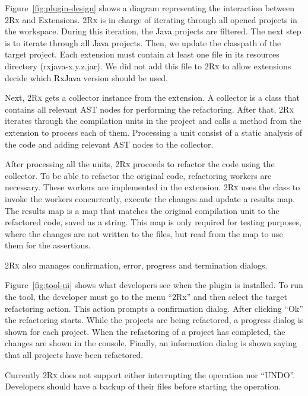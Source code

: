 \documentclass[type=bsc,accentcolor=tud9c]{tudthesis}
\newcommand{\framework}[1]{\textcolor{black}{#1}}
\newcommand{\toolcore}{\textsc{2Rx}}
\begin{document}
Figure~\ref{fig:plugin-design} shows a diagram representing the interaction between \toolcore{} and Extensions. \toolcore{} is in charge of iterating through all opened projects in the workspace. During this iteration, the \framework{Java} projects are filtered. The next step is to iterate through all \framework{Java} projects. Then, we update the classpath of the target project. Each extension must contain at least one  file in its resources directory (rxjava-x.y.z.jar). We did not add this  file to \toolcore{} to allow extensions decide which \framework{RxJava} version should be used.

Next, \toolcore{} gets a collector instance from the extension. A collector is a class that contains all relevant AST nodes for performing the refactoring. After that, \toolcore{} iterates through the compilation units in the project and calls a method from the extension to process each of them. Processing a unit consist of a static analysis of the code and adding relevant AST nodes to the collector.

After processing all the units, \toolcore{} proceeds to refactor the code using the collector. To be able to refactor the original code, refactoring workers are necessary. These workers are implemented in the extension. \toolcore{} uses the class  to invoke the workers concurrently, execute the changes and update a results map. The results map is a map that matches the original compilation unit to the refactored code, saved as a string. This map is only required for testing purposes, where the changes are not written to the files, but read from the map to use them for the assertions.

\toolcore{} also manages confirmation, error, progress and termination dialogs.

Figure~\ref{fig:tool-ui} shows what developers see when the plugin is installed. To run the tool, the developer must go to the menu ``2Rx'' and then select the target refactoring action. This action prompts a confirmation dialog. After clicking ``Ok'' the refactoring starts. While the projects are being refactored, a progress dialog is shown for each project. When the refactoring of a project has completed, the changes are shown in the console. Finally, an information dialog is shown saying that all projects have been refactored.

Currently \toolcore{} does not support either interrupting the operation nor ``UNDO''. Developers should have a backup of their files before starting the operation.
\end{document}
